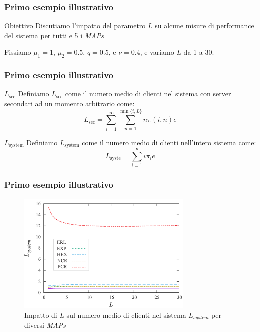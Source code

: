 \documentclass{beamer}
\begin{document}
\begin{frame}
    \frametitle{Primo esempio illustrativo}
    \begin{block}{Obiettivo}
        Discutiamo l'impatto del parametro $L$ su alcune misure di performance del sistema per tutti e 5 i \emph{MAPs}
    \end{block}
    Fissiamo $\mu_1=1$, $\mu_2=0.5$, $q=0.5$, e $\nu=0.4$, e variamo $L$ da 1 a 30.
\end{frame}

\begin{frame}
    \frametitle{Primo esempio illustrativo}
    \begin{block}{$L_{\mathrm{sec}}$}
        Definiamo $L_{\mathrm{sec}}$ come il numero medio di clienti nel sistema con server secondari ad un momento arbitrario come:
        $$ L_{\mathrm{sec}} = \sum_{i=1}^{\infty} \sum_{n=1}^{\min\{i,L\}} n \pi (i,n) e $$
    \end{block}
    \begin{block}{$L_{\mathrm{system}}$}
        Definiamo $L_{\mathrm{system}}$ come il numero medio di clienti nell'intero sistema come:
        $$ L_{\mathrm{syste}} = \sum_{i=1}^{\infty} i \pi_i e $$
    \end{block}
\end{frame}

\begin{frame}
    \frametitle{Primo esempio illustrativo}
    \begin{figure}[h]
        \centering
        \includegraphics[width=0.75\textwidth]{gtHnIzQ.png}
        \caption{Impatto di $L$ sul numero medio di clienti nel sistema $L_{system}$ per diversi \emph{MAPs}}
        \label{fig:1}
    \end{figure}
\end{frame}
\end{document}
